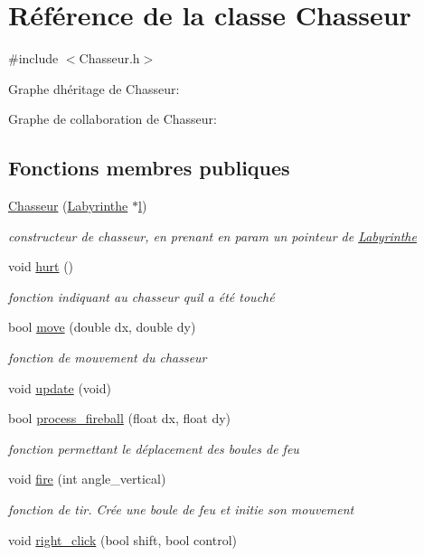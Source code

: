 \hypertarget{classChasseur}{}\section{Référence de la classe Chasseur}
\label{classChasseur}


{\ttfamily \#include $<$Chasseur.\+h$>$}



Graphe d\textquotesingle{}héritage de Chasseur\+:


Graphe de collaboration de Chasseur\+:
\subsection*{Fonctions membres publiques}
\begin{DoxyCompactItemize}
\item 
\hyperlink{classChasseur_a1901991ecabfb707b82334f56b277560}{Chasseur} (\hyperlink{classLabyrinthe}{Labyrinthe} $\ast$\hyperlink{classChasseur_a96372f6800e28733746f01393aa47ff6}{l})
\begin{DoxyCompactList}\small\item\em constructeur de chasseur, en prenant en param un pointeur de \hyperlink{classLabyrinthe}{Labyrinthe} \end{DoxyCompactList}\item 
void \hyperlink{classChasseur_ac75a09254dea5b1d25c7dbf49809a273}{hurt} ()
\begin{DoxyCompactList}\small\item\em fonction indiquant au chasseur qu\textquotesingle{}il a été touché \end{DoxyCompactList}\item 
bool \hyperlink{classChasseur_ac5275e34388084bc3ca2114b45a0b725}{move} (double dx, double dy)
\begin{DoxyCompactList}\small\item\em fonction de mouvement du chasseur \end{DoxyCompactList}\item 
void \hyperlink{classChasseur_a6ea64de0a2708b21326dcb980f0e06ac}{update} (void)
\item 
bool \hyperlink{classChasseur_a00710f53a84dfcf6ae60deed589cea1e}{process\+\_\+fireball} (float dx, float dy)
\begin{DoxyCompactList}\small\item\em fonction permettant le déplacement des boules de feu \end{DoxyCompactList}\item 
void \hyperlink{classChasseur_ae4610a58bb02ee492e8bdfbee917db8a}{fire} (int angle\+\_\+vertical)
\begin{DoxyCompactList}\small\item\em fonction de tir. Crée une boule de feu et initie son mouvement \end{DoxyCompactList}\item 
void \hyperlink{classChasseur_ac33c7c026b2bb1c05d074fa196bd1fae}{right\+\_\+click} (bool shift, bool control)
\end{DoxyCompactItemize}
